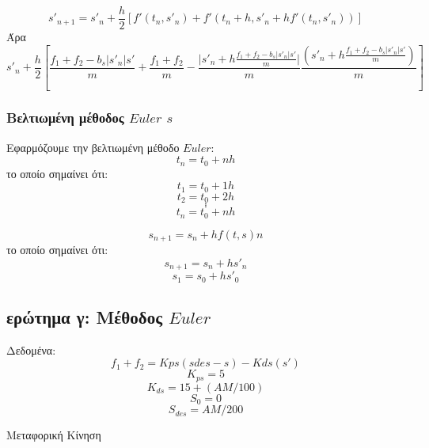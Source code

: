 \documentclass[a4paper]{article}
\begin{document}
        \hrulefill{}
        \[s'_{n+1}=s'_n+\frac{h}{2}{[f'(t_n, s'_n)+f'(t_n+h, s'_n+hf'(t_n,s'_n))]}\]
        Άρα
        \[s'_n+\frac{h}{2}{[\frac{f_1+f_2-b_s\rvert s'_n \lvert s'}{m}+\frac{f_1+f_2}{m}-\frac{\lvert s'_n+h\frac{f_1+f_2-b_s\rvert s'_n \lvert s'}{m}\rvert}{m}\frac{(s'_n+h\frac{f_1+f_2-b_s\rvert s'_n \lvert s'}{m})}{m}]}\]
        
        \subsubsection*{Bελτιωμένη μέθοδος $Euler$ $s$}
        Εφαρμόζουμε την βελτιωμένη μέθοδο $Euler$:
        \[t_n=t_0+nh\]
        το οποίο σημαίνει ότι:
        \[t_1=t_0+1h\]
        \[t_2=t_0+2h\]
        \[.\]
        \[.\]
        \[.\]
        \[t_n=t_0+nh\]

        \hrulefill{}

        \[s_{n+1}=s_n+hf(t,s)n\]
        το οποίο σημαίνει ότι:
        \[s_{n+1}=s_n+hs'_n\]
        \[s_1=s_0+hs'_0\]
        \subsection{ερώτημα γ: Μέθοδος $Euler$}

        Δεδομένα:
        \begin{equation}
            f_1 + f_2 = Kps (sdes - s) - Kds (s')
        \end{equation}
        \begin{equation}
            K_{ps} = 5
        \end{equation}
        \begin{equation}
            K_{ds} = 15 + (AM/ 100)
        \end{equation}
        \begin{equation}
            S_0 =0
        \end{equation}
        \begin{equation}
            S_{des} = AM / 200
        \end{equation}
            
        

        Μεταφορική Κίνηση

\end{document}
